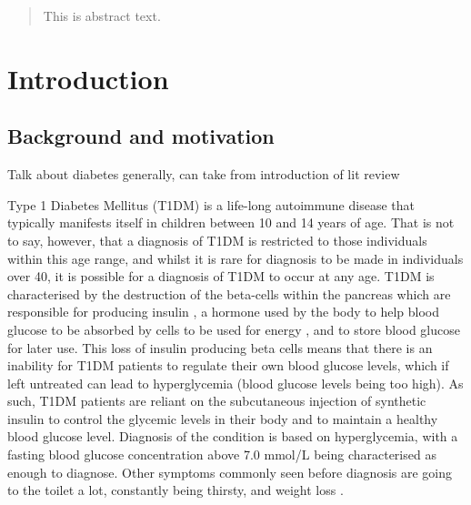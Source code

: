 \uomtoc%


\begin{abstract} %
  This is abstract text. 
  
\end{abstract}%
\clearpage

\section{Introduction}

  \subsection{Background and motivation}
    Talk about diabetes generally, can take from introduction of lit review

    Type 1 Diabetes Mellitus (T1DM) is a life-long autoimmune disease that typically manifests itself in children between 10 and 14 years of age. That is not to say, however, that a diagnosis of T1DM is restricted to those individuals within this age range, and whilst it is rare for diagnosis to be made in individuals over 40, it is possible for a diagnosis of T1DM to occur at any age. T1DM is characterised by the destruction of the beta-cells within the pancreas which are responsible for producing insulin \cite{t1d}, a hormone used  by the body to help blood glucose to be absorbed by cells to be used for energy \cite{insulin}, and to store blood glucose for later use. This loss of insulin producing beta cells means that there is an inability for T1DM patients to regulate their own blood glucose levels, which if left untreated can lead to hyperglycemia (blood glucose levels being too high). As such, T1DM patients are reliant on the subcutaneous injection of synthetic insulin to control the glycemic levels in their body and to maintain a healthy blood glucose level. Diagnosis of the condition is based on hyperglycemia, with a fasting blood glucose concentration above 7.0 mmol/L being characterised as enough to diagnose. Other symptoms commonly seen before diagnosis are going to the toilet a lot, constantly being thirsty, and weight loss \cite{t1dcauses}.

